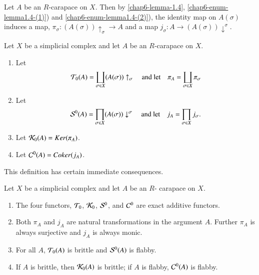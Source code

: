 \newpage

Let $A$ be an $R$-carapace on $X$. Then by \ref{chap6-lemma-1.4}, \ref{chap6-enum-lemma1.4-(1)}) and \ref{chap6-enum-lemma1.4-(2)}), the identity map on $A(\sigma)$ induces a map, $\pi_{\sigma} : (A(\sigma))\uparrow_{\sigma} \rightarrow A$ and a map $j_{\sigma} : A\rightarrow (A(\sigma))\downarrow^{\sigma}$.  

\begin{definition}\label{chap6-definition-7.1}
Let $X$ be a simplicial complex and let $A$ be an $R$-carapace on $X$.
    \begin{enumerate}[(1)]
    \item Let
        $$
        \mathcal{T}_{0}(A) = \coprod_{\sigma \in X}(A(\sigma))\uparrow_{\sigma} \quad \text{and let} \quad \pi_{A}= \coprod_{\sigma \in X}\pi_{\sigma} 
        $$\label{chap6-definition7.1-enum-1}
        
    \item Let
        $$
        \mathcal{S}^{0}(A) = \prod_{\sigma \in X}(A(\sigma))\downarrow^{\sigma} \quad \text{and let} \quad j_{A}= \prod_{\sigma \in X}j_{\sigma}.
        $$\label{chap6-definition7.1-enum-2}

     \item Let $\mathcal{K}_{0}(A) = Ker(\pi_{A})$.\label{chap6-definition7.1-enum-3}
     \item Let $\mathcal{C}^{0}(A) = Coker(j_{A})$.\label{chap6-definition7.1-enum-4}  
    \end{enumerate}

    This definition has certain immediate consequences.
\end{definition}

\begin{seclem}\label{chap6-lemma-7.2}
 Let $X$ be a simplicial complex and let $A$ be an $R$- carapace on $X$.
\begin{enumerate}[(1)]
\item The four functors, $\mathcal{T}_{0}$, $\mathcal{K}_{0}$, $\mathcal{S}^{0}$, and $\mathcal{C}^{0}$ are exact additive functors.\label{chap6-lemma7.2-enum-1}
\item Both $\pi_{A}$ and $j_{A}$ are natural transformations in the argument $A$. Further $\pi_{A}$ is always surjective and $j_{A}$ is always monic.\label{chap6-lemma7.2-enum-2}

\item For all $A$, $\mathcal{T}_{0}(A)$ is brittle and $\mathcal{S}^{0}(A)$ is flabby.\label{chap6-lemma7.2-enum-3}
\item If $A$ is brittle, then $\mathcal{K}_{0}(A)$ is brittle; if $A$ is flabby, $\mathcal{C}^{0}(A)$ is flabby.\label{chap6-lemma7.2-enum-4}
\end{enumerate}
\end{seclem}

